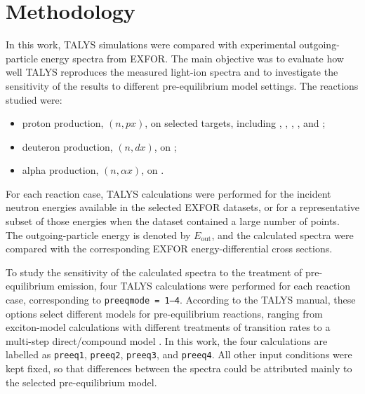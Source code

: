 \section{Methodology}

In this work, TALYS simulations were compared with experimental outgoing-particle energy spectra from EXFOR. The main objective was to evaluate how well TALYS reproduces the measured light-ion spectra and to investigate the sensitivity of the results to different pre-equilibrium model settings. The reactions studied were:

\begin{itemize}
\item proton production, \((n,px)\), on selected targets, including , , , , and ;
\item deuteron production, \((n,dx)\), on ;
\item alpha production, \((n,\alpha x)\), on .
\end{itemize}

For each reaction case, TALYS calculations were performed for the incident neutron energies available in the selected EXFOR datasets, or for a representative subset of those energies when the dataset contained a large number of points. The outgoing-particle energy is denoted by \(E_{\mathrm{out}}\), and the calculated spectra were compared with the corresponding EXFOR energy-differential cross sections.

To study the sensitivity of the calculated spectra to the treatment of pre-equilibrium emission, four TALYS calculations were performed for each reaction case, corresponding to \texttt{preeqmode = 1--4}. According to the TALYS manual, these options select different models for pre-equilibrium reactions, ranging from exciton-model calculations with different treatments of transition rates to a multi-step direct/compound model \cite{koning2025talys}. In this work, the four calculations are labelled as \texttt{preeq1}, \texttt{preeq2}, \texttt{preeq3}, and \texttt{preeq4}. All other input conditions were kept fixed, so that differences between the spectra could be attributed mainly to the selected pre-equilibrium model.

